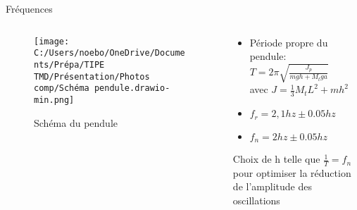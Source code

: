 \documentclass{beamer}
\begin{document}
\begin{frame}{Fréquences}
	\begin{columns}
		\begin{column}{0.5\textwidth}
			\begin{figure}
				\texttt{[image: C:/Users/noebo/OneDrive/Documents/Prépa/TIPE TMD/Présentation/Photos comp/Schéma pendule.drawio-min.png]}
				\caption{Schéma du pendule}
			\end{figure}
		\end{column}
		\begin{column}{0.5\textwidth}
			\begin{itemize}
				\item 	Période propre du pendule: $T= 2\pi\sqrt{\frac{J_{p}}{mgh+M_{t}ga}}$ \\
				avec $J=\frac{1}{3}M_{t}L^2 + mh^2$
				\vspace{12pt}
				\item  $f_{r}= 2,1 hz \pm 0.05 hz$ 
				\item  $f_{n}= 2 hz \pm 0.05 hz$ 
			\end{itemize}
		\vspace{12pt}
			Choix de h telle que $\frac{1}{T}=f_{n}$ pour optimiser la réduction de l'amplitude des oscillations
		
		
			\end{column}
	\end{columns}
\end{frame}


  
\end{document}
